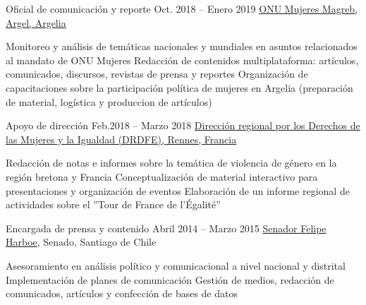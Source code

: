 \begin{joblist}[13.2][7.8][3.4]

\item[Oficial de comunicación y reporte]{Oct. 2018 -- Enero 2019 }
    {
    \href{http://maghreb.unwomen.org/fr}{ONU Mujeres Magreb, Argel, Argelia}
    }
    {
        \vspace{-0.5cm}
        \begin{itemize}
            \iftbftiny \setlength\itemsep{-3pt} \fi
            \cvitem[\checkmark]  Monitoreo y análisis de temáticas nacionales y mundiales en asuntos relacionados al mandato de ONU Mujeres
            \cvitem[\checkmark]  Redacción de contenidos multiplataforma: artículos, comunicados, discursos, revistas de prensa y reportes
            \cvitem[\checkmark]  Organización de capacitaciones sobre la participación política de mujeres en Argelia (preparación de material, logística y produccion de artículos)
        \end{itemize}
    }


\item[Apoyo de dirección]{Feb.2018 -- Marzo 2018 }
    {
    \href{https://www.egalite-femmes-hommes.gouv.fr/le-secretariat-d-etat/organisation-du-ministere/services-territoriaux/annuaire-des-equipes-regionales-et-departementales/}{Dirección regional por los Derechos de las Mujeres y la Igualdad (DRDFE), Rennes, Francia}
    }
    {
        \iftbftiny \vspace{-0.5cm} \fi
        \begin{itemize}
            \iftbftiny \setlength\itemsep{-3pt} \fi
            \cvitem[\checkmark] Redacción de notas e informes sobre la temática de violencia de género en la región bretona y Francia
            \cvitem[\checkmark] Conceptualización de material interactivo para presentaciones y organización de eventos
            \cvitem[\checkmark] Elaboración de un informe regional de actividades sobre el ''Tour de France de l'Égalité''
        \end{itemize}
    }



\item[Encargada de prensa y contenido ]{Abril 2014 -- Marzo 2015}
    {
    \href{https://www.harboe.cl/}{Senador Felipe Harboe}, Senado, Santiago de Chile
    }
    {
        \iftbftiny \vspace{-0.5cm} \fi
        \begin{itemize}
            \iftbftiny \setlength\itemsep{-3pt} \fi
            \cvitem[\checkmark] Asesoramiento en análisis político y comunicacional a nivel nacional y distrital
            \cvitem[\checkmark] Implementación de planes de comunicación  
            \cvitem[\checkmark] Gestión de medios, redacción de comunicados, artículos y confección de bases de datos
            

\end{itemize}}
\end{joblist}
